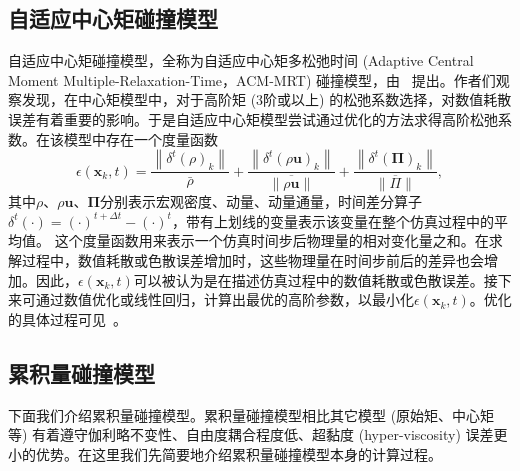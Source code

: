 \subsection{自适应中心矩碰撞模型}
\label{sec:background_acmmrt}
自适应中心矩碰撞模型，全称为自适应中心矩多松弛时间 (Adaptive Central Moment Multiple-Relaxation-Time，ACM-MRT) 碰撞模型，由~\citet{Li-2020} 提出。作者们观察发现，在中心矩模型中，对于高阶矩 (3阶或以上) 的松弛系数选择，对数值耗散误差有着重要的影响。于是自适应中心矩模型尝试通过优化的方法求得高阶松弛系数。在该模型中存在一个度量函数
\begin{equation}
    \epsilon\left(\mathbf{x}_k, t\right)=\frac{\left\|\delta^t(\rho)_k\right\|}{\bar{\rho}}+\frac{\left\|\delta^t(\rho \mathbf{u})_k\right\|}{\overline{\|\rho \mathbf{u}\|}}+\frac{\left\|\delta^t(\boldsymbol{\Pi})_k\right\|}{\overline{\|\Pi\|}},
\end{equation}
其中$\rho$、$\rho \mathbf{u}$、$\boldsymbol{\Pi}$分别表示宏观密度、动量、动量通量，时间差分算子$\delta^t(\cdot)=(\cdot)^{t+\Delta t}-(\cdot)^{t}$，带有上划线的变量表示该变量在整个仿真过程中的平均值。
这个度量函数用来表示一个仿真时间步后物理量的相对变化量之和。在求解过程中，数值耗散或色散误差增加时，这些物理量在时间步前后的差异也会增加。因此，$\epsilon(\mathbf{x}_k, t)$可以被认为是在描述仿真过程中的数值耗散或色散误差。接下来可通过数值优化或线性回归，计算出最优的高阶参数，以最小化$\epsilon\left(\mathbf{x}_k, t\right)$。优化的具体过程可见~\citep{Li-2020}。

\subsection{累积量碰撞模型}
\label{sec:cumulant}
下面我们介绍累积量碰撞模型。累积量碰撞模型相比其它模型 (原始矩、中心矩等) 有着遵守伽利略不变性、自由度耦合程度低、超黏度 (hyper-viscosity) 误差更小的优势。在这里我们先简要地介绍累积量碰撞模型本身的计算过程。

